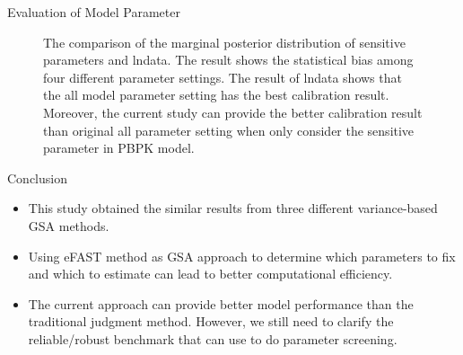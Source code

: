 \documentclass[xcolor=table]{beamer}
\begin{document}
\begin{frame}[t]
\begin{columns}[t]
\begin{column}{0.23\paperwidth}
\begin{block}{Evaluation of Model Parameter}
\begin{figure}
\caption{The comparison of the marginal posterior distribution of sensitive parameters and lndata. The result shows the statistical bias among four different parameter settings.
The result of lndata shows that the all model parameter setting has the best calibration result. 
Moreover, the current study can provide the better calibration result than original all parameter setting when only consider the sensitive parameter in PBPK model.
}
\end{figure}
\end{block}
\begin{alertblock}{Conclusion}
\begin{itemize}
\item This study obtained the similar results from three different variance-based GSA methods.
\item Using eFAST method as GSA approach to determine which parameters to fix and which to estimate can lead to better computational efficiency.
\item The current approach can provide better model performance than the traditional judgment method.
However, we still need to clarify the reliable/robust benchmark that can use to do parameter screening.
\end{itemize}
\end{alertblock}
%
%
\end{column} %


\end{columns}
\end{frame}
\end{document}
